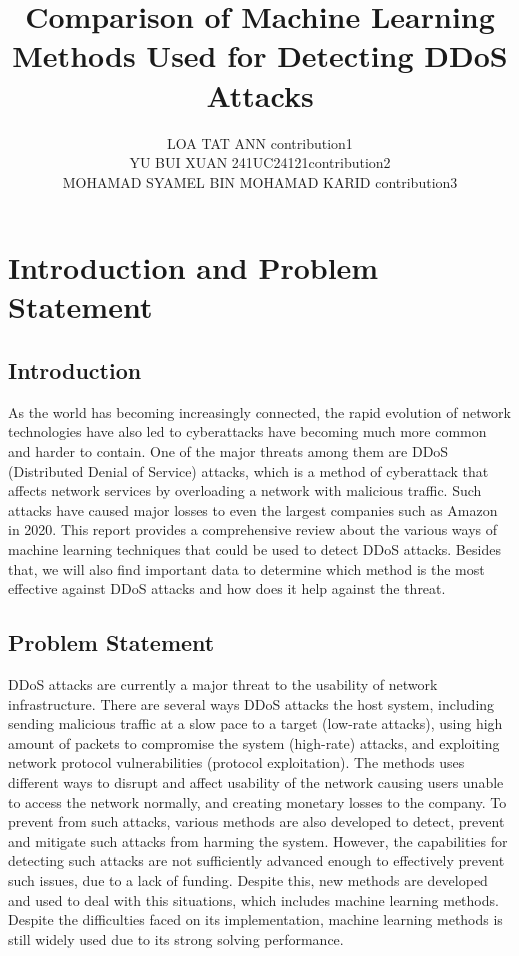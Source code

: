 \documentclass[a4paper, 12pt]{article}
\author{
LOA TAT ANN \quad 1221304731 \quad  contribution1 \\
YU BUI XUAN \quad 241UC24121\quad contribution2\\
MOHAMAD SYAMEL BIN MOHAMAD KARID \quad 1221309130 \quad contribution3\\
}
\title{Comparison of Machine Learning Methods Used for Detecting DDoS Attacks }
\begin{document}
\maketitle

\section{Introduction and Problem Statement}

\subsection{Introduction}
As the world has becoming increasingly connected, the rapid evolution of network technologies have also led to cyberattacks have becoming much more common and harder to contain. One of the major threats among them are DDoS (Distributed Denial of Service) attacks, which is a method of cyberattack that affects network services by overloading a network with malicious traffic.\cite{4} Such attacks have caused major losses to even the largest companies such as Amazon in 2020. This report provides a comprehensive review about the various ways of machine learning techniques that could be used to detect DDoS attacks. Besides that, we will also find important data to determine which method is the most effective against DDoS attacks and how does it help against the threat. 

\subsection{Problem Statement}
DDoS attacks are currently a major threat to the usability of network infrastructure. There are several ways DDoS attacks the host system, including sending malicious traffic at a slow pace to a target (low-rate attacks), using high amount of packets to compromise the system (high-rate) attacks, and exploiting network protocol vulnerabilities (protocol exploitation). \cite{1} The methods uses different ways to disrupt and affect usability of the network causing users unable to access the network normally, and creating monetary losses to the company. To prevent from such attacks, various methods are also developed to detect, prevent and mitigate such attacks from harming the system. However, the capabilities for detecting such attacks are not sufficiently advanced enough to effectively prevent such issues, due to a lack of funding. \cite{1} Despite this, new methods are developed and used to deal with this situations, which includes machine learning methods. Despite the difficulties faced on its implementation, machine learning methods is still widely used due to its strong solving performance. \cite{7}
\end{document}
